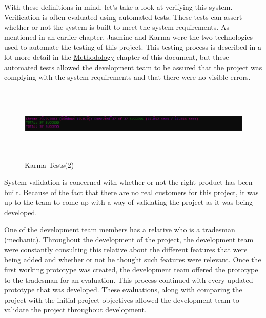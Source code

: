 \bigskip

With these definitions in mind, let's take a look at verifying this system. Verification is often evaluated using automated tests. These tests can assert whether or not the system is built to meet the system requirements. As mentioned in an earlier chapter, Jasmine and Karma were the two technologies used to automate the testing of this project. This testing process is described in a lot more detail in the \hyperref[sec:MethodologyTesting]{\underline{Methodology}} chapter of this document, but these automated tests allowed the development team to be assured that the project was complying with the system requirements and that there were no visible errors.



\begin{figure}[H]
    \centering
    \includegraphics[width=\textwidth, height=100pt]{img/KarmaTests2.PNG}
    \caption{Karma Tests(2)}
    \label{fig:my_label}
\end{figure}

\bigskip

System validation is concerned with whether or not the right product has been built. Because of the fact that there are no real customers for this project, it was up to the team to come up with a way of validating the project as it was being developed. 

\bigskip

One of the development team members has a relative who is a tradesman (mechanic). Throughout the development of the project, the development team were constantly consulting this relative about the different features that were being added and whether or not he thought such features were relevant. Once the first working prototype was created, the development team offered the prototype to the tradesman for an evaluation. This process continued with every updated prototype that was developed. These evaluations, along with comparing the project with the initial project objectives allowed the development team to validate the project throughout development.

